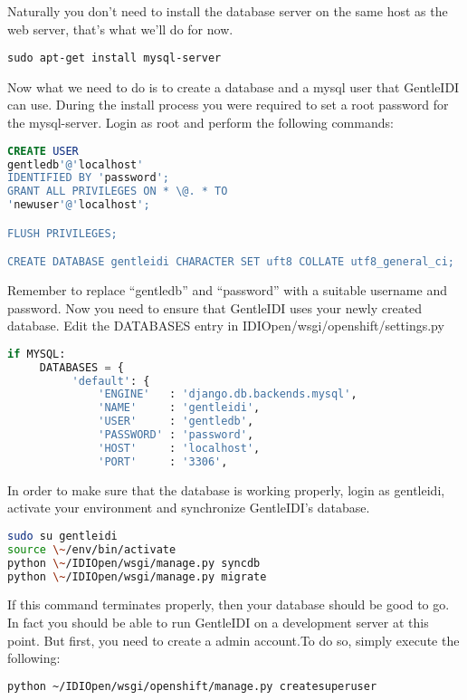 Naturally you don't need to install the database server
on the same host as the web server, that's what
we'll do for now.

\begin{lstlisting}
sudo apt-get install mysql-server
\end{lstlisting}

Now what we need to do is to create a database and a mysql user that
GentleIDI can use. During the install process you were required to set
a root password for the mysql-server. Login as root and perform the
following commands:

\begin{lstlisting}[language=SQL]
CREATE USER
gentledb'@'localhost'
IDENTIFIED BY 'password';
GRANT ALL PRIVILEGES ON * \@. * TO
'newuser'@'localhost';

FLUSH PRIVILEGES;

CREATE DATABASE gentleidi CHARACTER SET uft8 COLLATE utf8_general_ci;
\end{lstlisting}

Remember to replace ``gentledb'' and ``password'' with a suitable username and
password. Now you need to ensure that GentleIDI uses your newly created
database.  Edit the DATABASES entry in IDIOpen/wsgi/openshift/settings.py

\begin{lstlisting}[language=Python]
if MYSQL:
     DATABASES = {
          'default': {
              'ENGINE'   : 'django.db.backends.mysql',
              'NAME'     : 'gentleidi',
              'USER'     : 'gentledb',
              'PASSWORD' : 'password',
              'HOST'     : 'localhost',
              'PORT'     : '3306',
\end{lstlisting}

In order to make sure that the database is working properly, login as
gentleidi, activate your environment and synchronize
GentleIDI's database.

\begin{lstlisting}[language=bash]
sudo su gentleidi
source \~/env/bin/activate
python \~/IDIOpen/wsgi/manage.py syncdb
python \~/IDIOpen/wsgi/manage.py migrate
\end{lstlisting}

If this command terminates properly, then your database should be good
to go. In fact you should be able to run GentleIDI on a development
server at this point. But first, you need to create a admin account.To
do so, simply execute the following:

\begin{lstlisting}[language=bash]
python ~/IDIOpen/wsgi/openshift/manage.py createsuperuser
\end{lstlisting}

